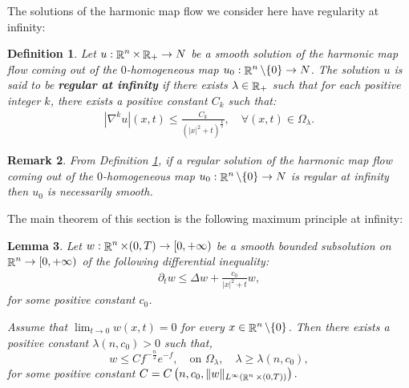 \documentclass[a4paper,11pt,reqno]{amsart}
\newtheorem{defn}{Definition}[section]
\newtheorem{lemma}[defn]{Lemma}
\newtheorem{rk}[defn]{Remark}
\def\R{\mathop{\rm \mathbb{R}}\nolimits}
\begin{document}
The solutions of the harmonic map flow we consider here have regularity at infinity: 
\begin{defn}\label{def-reg-inf}
Let $u:\R^n\times\R_+\rightarrow N$ be a smooth solution of the harmonic map flow coming out of the $0$-homogeneous map $u_0:\R^n\setminus\{0\}\rightarrow N$. The solution $u$ is said to be \textbf{regular at infinity} if there exists $\lambda\in\R_+$ such that for each positive integer $k$, there exists a positive constant $C_k$ such that:
\begin{eqnarray*}
|\nabla^k u|(x,t)\leq\frac{C_k}{(|x|^2+t)^{\frac{k}{2}}},\quad\forall (x,t)\in\Omega_{\lambda}.
\end{eqnarray*}


\end{defn}

\begin{rk}
From Definition \ref{def-reg-inf}, if a regular solution of the harmonic map flow coming out of the $0$-homogeneous map $u_0:\R^n\setminus\{0\}\rightarrow N$ is regular at infinity then $u_0$ is necessarily smooth.
\end{rk}


The main theorem of this section is the following maximum principle at infinity:
 \begin{lemma}\label{theo-max-ppe-l2}
Let $w:\R^n\times(0,T)\rightarrow[0,+\infty)$ be a smooth bounded subsolution on $\R^n\rightarrow[0,+\infty)$ of the following differential inequality:
\begin{eqnarray}
\partial_tw\leq\Delta w+\frac{c_0}{|x|^2+t}w,\label{inequ-w}
\end{eqnarray}
 for some positive constant $c_0$.
 
 Assume that $\lim_{t\rightarrow 0}w(x,t)=0$ for every $x\in\R^n\setminus\{0\}$. Then there exists a positive constant $\lambda(n,c_0)>0$ such that, $$w\leq Cf^{-\frac{n}{2}}e^{-f},\quad\text{on $\Omega_{\lambda},\quad\lambda\geq\lambda(n,c_0),$}$$
 for some positive constant $C=C\left(n,c_0,\|w\|_{L^{\infty}(\R^n\times(0,T))}
\right).$ 
\end{lemma}
\end{document}
